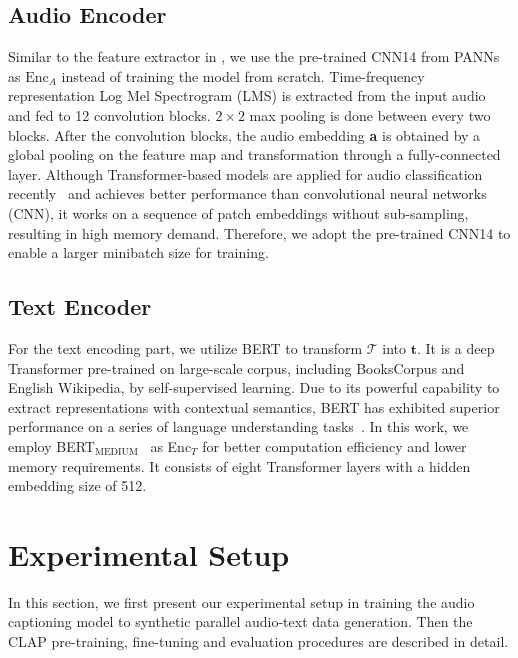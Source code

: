 \documentclass[sigconf,anonymous,review]{acmart}
\begin{document}
\subsection{Audio Encoder}
Similar to the feature extractor in , we use the pre-trained CNN14 from PANNs~\citep{kong2020panns} as $\text{Enc}_A$ instead of training the model from scratch.
Time-frequency representation Log Mel Spectrogram (LMS) is extracted from the input audio and fed to 12 convolution blocks. %
$2\times2$ max pooling is done between every two blocks.
After the convolution blocks, the audio embedding \textbf{a} is obtained by a global pooling on the feature map and transformation through a fully-connected layer. 
Although Transformer-based models are applied for audio classification recently~\cite{gong2021audio} and achieves better performance than convolutional neural networks (CNN), it works on a sequence of patch embeddings without sub-sampling, resulting in high memory demand.
Therefore, we adopt the pre-trained CNN14 to enable a larger minibatch size for training.

\subsection{Text Encoder}
For the text encoding part, we utilize BERT to transform $\mathcal{T}$ into $\mathbf{t}$.
It is a deep Transformer pre-trained on large-scale corpus, including BooksCorpus and English Wikipedia, by self-supervised learning.
Due to its powerful capability to extract representations with contextual semantics, BERT has exhibited superior performance on a series of language understanding tasks~\cite{devlin2019bert}. %
In this work, we employ BERT$_\text{MEDIUM}$~\cite{turc2019well} as Enc$_T$ for better computation efficiency and lower memory requirements.
It consists of eight Transformer layers with a hidden embedding size of 512.


\section{Experimental Setup}
In this section, we first present our experimental setup in training the audio captioning model to synthetic parallel audio-text data generation.
Then the CLAP pre-training, fine-tuning and evaluation procedures are described in detail.
\end{document}
